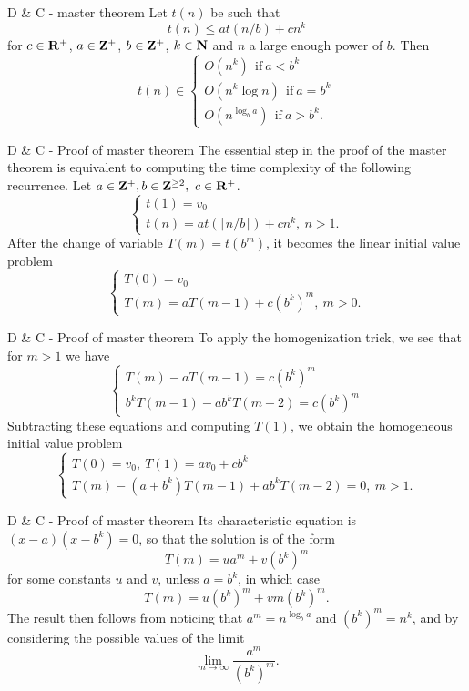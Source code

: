 \documentclass{beamer}
\begin{document}
%

\begin{frame}{D \& C - master theorem}
	Let $t(n)$ be such that
	\[
		t(n) \leq at(n/b) + cn^k
	\]
	for $c \in \mathbf{R}^+$, $a \in \mathbf{Z}^+$, $b \in \mathbf{Z}^+$, $k \in \mathbf{N}$ and $n$ a
	large enough power of $b$. Then
	\[
		t(n) \in
		\begin{cases}
			O(n^k)\ \ \text{if}\ a < b^k\\
			O(n^k\log n)\ \ \text{if}\ a = b^k\\
			O(n^{\log_b a})\ \ \text{if}\ a > b^k.
		\end{cases}
	\]
\end{frame}

%

\begin{frame}{D \& C - Proof of master theorem}
	The essential step in the proof of the master theorem is equivalent to
	computing the time complexity of the following recurrence. Let $a \in \mathbf{Z}^+,
	b \in \mathbf{Z}^{\geq 2},\ c \in \mathbf{R}^+$.
	\[
		\begin{cases}\label{mtr} %
			t(1)= v_0\\
			t(n)= at(\lceil n/b \rceil) + cn^k,\ n > 1.
		\end{cases}
	\]
	After the change of variable $T(m)= t(b^m)$, it becomes the linear initial
	value problem
	\[
		\begin{cases}\label{mtl} %
			T(0)= v_0\\
			T(m)= aT(m-1) + c(b^k)^m,\ m > 0.
		\end{cases}
	\]
\end{frame}

%

\begin{frame}{D \& C - Proof of master theorem}
	To apply the homogenization trick, we see that for $m > 1$ we have 
	\[
		\begin{cases}
			T(m) - aT(m-1) = c(b^k)^m\\
			b^kT(m-1) - ab^kT(m-2) = c(b^k)^m
		\end{cases}
	\]
	Subtracting these equations and computing $T(1)$, we obtain the homogeneous
	initial value problem
	\[
		\begin{cases}
			T(0)= v_0,\ T(1)= av_0 + cb^k\\
			T(m) - (a + b^k)T(m-1) + ab^kT(m-2)= 0,\ m > 1.
		\end{cases}
	\]
\end{frame}

%

\begin{frame}{D \& C - Proof of master theorem}
	Its characteristic equation is $(x - a)(x - b^k)= 0$, so that the solution
	is of the form
	\[
		T(m) = ua^m + v(b^k)^m
	\]
	for some constants $u$ and $v$, unless $a = b^k$, in which case
	\[
		T(m) = u(b^k)^m + vm(b^k)^m.
	\]
	The result then follows from noticing that $a^m = n^{\log_b a}$ and
	$(b^k)^m = n^k$, and by considering the possible values of the limit
	\[
		\lim_{m \to \infty} \frac{a^m}{(b^k)^m}.
	\]
\end{frame}
\end{document}
